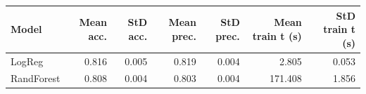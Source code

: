 \begin{tabular}{lrrrrrr}
\hline
 Model      &   Mean acc. &   StD acc. &   Mean prec. &   StD prec. &   Mean train t (s) &   StD train t (s) \\
\hline
 LogReg     &       0.816 &      0.005 &        0.819 &       0.004 &              2.805 &             0.053 \\
 RandForest &       0.808 &      0.004 &        0.803 &       0.004 &            171.408 &             1.856 \\
\hline
\end{tabular}
